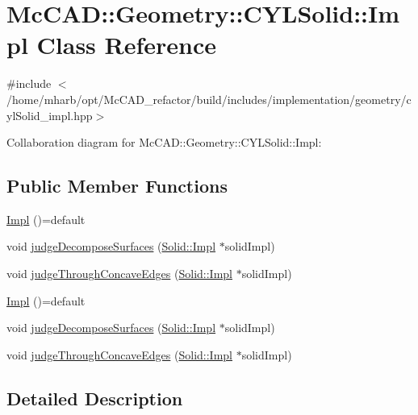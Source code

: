 \hypertarget{classMcCAD_1_1Geometry_1_1CYLSolid_1_1Impl}{}\section{Mc\+C\+AD\+:\+:Geometry\+:\+:C\+Y\+L\+Solid\+:\+:Impl Class Reference}
\label{classMcCAD_1_1Geometry_1_1CYLSolid_1_1Impl}


{\ttfamily \#include $<$/home/mharb/opt/\+Mc\+C\+A\+D\+\_\+refactor/build/includes/implementation/geometry/cyl\+Solid\+\_\+impl.\+hpp$>$}



Collaboration diagram for Mc\+C\+AD\+:\+:Geometry\+:\+:C\+Y\+L\+Solid\+:\+:Impl\+:
\subsection*{Public Member Functions}
\begin{DoxyCompactItemize}
\item 
\hyperlink{classMcCAD_1_1Geometry_1_1CYLSolid_1_1Impl_aa5aaae52593903382e854bba3937ce4a}{Impl} ()=default
\item 
void \hyperlink{classMcCAD_1_1Geometry_1_1CYLSolid_1_1Impl_adbcf36fa6cdfd03153b9cabf1b533691}{judge\+Decompose\+Surfaces} (\hyperlink{classMcCAD_1_1Geometry_1_1Solid_1_1Impl}{Solid\+::\+Impl} $\ast$solid\+Impl)
\item 
void \hyperlink{classMcCAD_1_1Geometry_1_1CYLSolid_1_1Impl_a175966ac5e1a3e4f65b78dc22ee34677}{judge\+Through\+Concave\+Edges} (\hyperlink{classMcCAD_1_1Geometry_1_1Solid_1_1Impl}{Solid\+::\+Impl} $\ast$solid\+Impl)
\item 
\hyperlink{classMcCAD_1_1Geometry_1_1CYLSolid_1_1Impl_aa5aaae52593903382e854bba3937ce4a}{Impl} ()=default
\item 
void \hyperlink{classMcCAD_1_1Geometry_1_1CYLSolid_1_1Impl_adbcf36fa6cdfd03153b9cabf1b533691}{judge\+Decompose\+Surfaces} (\hyperlink{classMcCAD_1_1Geometry_1_1Solid_1_1Impl}{Solid\+::\+Impl} $\ast$solid\+Impl)
\item 
void \hyperlink{classMcCAD_1_1Geometry_1_1CYLSolid_1_1Impl_a175966ac5e1a3e4f65b78dc22ee34677}{judge\+Through\+Concave\+Edges} (\hyperlink{classMcCAD_1_1Geometry_1_1Solid_1_1Impl}{Solid\+::\+Impl} $\ast$solid\+Impl)
\end{DoxyCompactItemize}


\subsection{Detailed Description}


